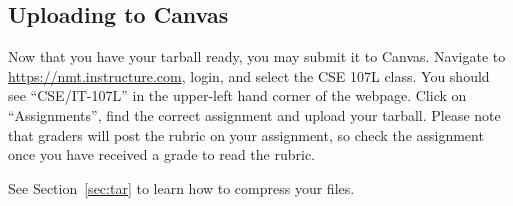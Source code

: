 \documentclass[11pt]{cselabheader}
\begin{document}
\subsection{Uploading to Canvas}\label{uploading-to-canvas}

Now that you have your tarball ready, you may submit it to Canvas.
Navigate to \url{https://nmt.instructure.com}, login, and select the
CSE 107L class.
You should see ``CSE/IT-107L'' in the upper-left hand corner of the webpage.
Click on ``Assignments'', find the correct assignment and upload your tarball.
Please note that graders will post the rubric on your assignment, so
check the assignment once you have received a grade to read the rubric.

\newpage
\printindex
\vfill


See Section~\ref{sec:tar} to learn how to compress your files.
\end{document}
